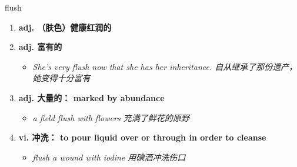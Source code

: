 
\begin{frame}
{\huge flush}
\begin{center}
\begin{enumerate}\Large
  \item \textbf{adj. （肤色）健康红润的}
  \item \textbf{adj. 富有的}
  \begin{itemize}
    \item \em{\Large{She's very flush now that she has her inheritance. 自从继承了那份遗产，她变得十分富有}}
  \end{itemize}
  \item \textbf{adj. 大量的： marked by abundance}
  \begin{itemize}
    \item \em{\Large{a field flush with flowers 充满了鲜花的原野}}
  \end{itemize}
  \item \textbf{vi. 冲洗： to pour liquid over or through in order to cleanse}
  \begin{itemize}
    \item \em{\Large{flush a wound with iodine 用碘酒冲洗伤口}}
  \end{itemize}
\end{enumerate}
\end{center}
\end{frame}
